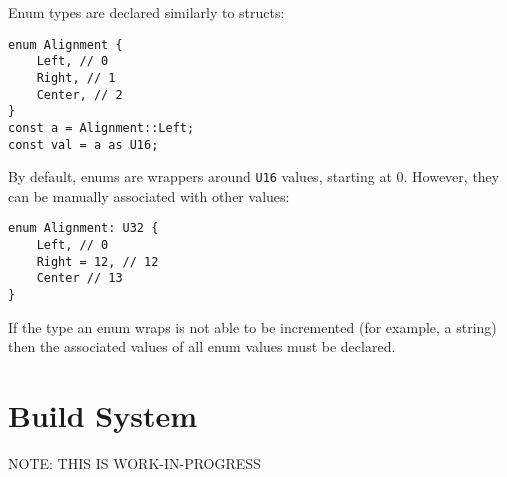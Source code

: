 \documentclass[12pt]{article}
\begin{document}
Enum types are declared similarly to structs:

\begin{lstlisting}
enum Alignment {
	Left, // 0
	Right, // 1
	Center, // 2
}
const a = Alignment::Left;
const val = a as U16;
\end{lstlisting}

By default, enums are wrappers around \lstinline!U16! values, starting at 0. However, they can be manually associated with other values:

\begin{lstlisting}
enum Alignment: U32 {
	Left, // 0
	Right = 12, // 12
	Center // 13
}
\end{lstlisting}

If the type an enum wraps is not able to be incremented (for example, a string) then the associated values of all enum values must be declared.

\section{Build System}

NOTE: THIS IS WORK-IN-PROGRESS
\end{document}

